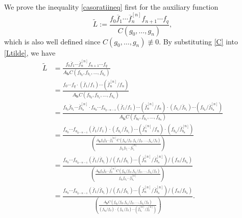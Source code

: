 \documentclass{amsart}
\theoremstyle{definition}
\numberwithin{equation}{section}
\numberwithin{theorem}{section}
\begin{document}
We prove the inequality \eqref{casoratiineq} first for the auxiliary function
    \begin{equation}\label{Ltilde}
    \widetilde L := \frac{f_0\overline{f}_1\cdots \overline{f}^{[n]}_n f_{n+1}\cdots
    f_q}{C(g_0,\ldots,g_n)},
    \end{equation}
which is also well defined since $C(g_0,\ldots,g_n)\not\equiv0$. By substituting \eqref{C} into
\eqref{Ltilde}, we have
    \begin{equation*}
    \begin{split}
    \widetilde L&=\frac{f_0\overline{f}_1\cdots \overline{f}^{[n]}_n f_{n+1}\cdots
    f_q}{A_\textbf{b} C(f_{b_0},f_{b_1},\ldots,f_{b_n})}\\
    &= \frac{ f_0\cdots f_q \cdot (\overline{f}_1/f_1)\cdots (\overline{f}_n^{[n]}/f_n)}
    {A_\textbf{b} C(f_{b_0},f_{b_1},\ldots,f_{b_n})}\\
    &=\frac{ f_{b_0}\overline{f}_{b_1}\cdots \overline{f}_{b_n}^{[n]} \cdot
    f_{a_0}\cdots f_{a_{q-n-1}} (\overline{f}_1/f_1)\cdots
    (\overline{f}_n^{[n]}/f_n)\cdot(f_{b_1}/\overline{f}_{b_1})\cdots(f_{b_n}/\overline{f}_{b_n}^{[n]})}
    {A_\textbf{b} C(f_{b_0},f_{b_1},\ldots,f_{b_n})}\\
    &= \frac{
    f_{a_0}\cdots f_{a_{q-n-1}} (\overline{f}_1/f_1)\cdot (f_{b_1}/\overline{f}_{b_1})\cdots
    (\overline{f}_n^{[n]}/f_n)\cdot(f_{b_n}/\overline{f}_{b_n}^{[n]})}
    {\displaystyle \left( \frac{A_\textbf{b} f_{0}\overline{f}_{0}\cdots \overline{f}_{0}^{[n]}
    C(f_{b_0}/f_0,f_{b_1}/f_0,\ldots,f_{b_n}/f_0)}{f_{b_0}\overline{f}_{b_1}\cdots \overline{f}_{b_n}^{[n]}}\right)}\\
    &= \frac{
    f_{a_0}\cdots f_{a_{q-n-1}} (\overline{f}_1/\overline{f}_{b_1})/(f_1/f_{b_1})\cdots
    (\overline{f}_n^{[n]}/\overline{f}_{b_n}^{[n]})/(f_n/f_{b_n})}
    {\displaystyle \left(\frac{A_\textbf{b} f_{0}\overline{f}_{0}\cdots \overline{f}_{0}^{[n]}
    C(f_{b_0}/f_0,f_{b_1}/f_0,\ldots,f_{b_n}/f_0)}{f_{b_0}\overline{f}_{b_1}\cdots \overline{f}_{b_n}^{[n]}}\right)}\\
    &= \frac{
    f_{a_0}\cdots f_{a_{q-n-1}} (\overline{f}_1/\overline{f}_{b_1})/(f_1/f_{b_1})\cdots
    (\overline{f}_n^{[n]}/\overline{f}_{b_n}^{[n]})/(f_n/f_{b_n})}
    {\displaystyle \left( \frac{A_\textbf{b} C(f_{b_0}/f_0,f_{b_1}/f_0,\ldots,f_{b_n}/f_0)}{(f_{b_0}/f_0)\cdot
    (\overline{f}_{b_1}/\overline{f}_{0})\cdots (\overline{f}_{b_n}^{[n]}/\overline{f}_{0}^{[n]})}\right)}.\\
    \end{split}
    \end{equation*}
\end{document}

